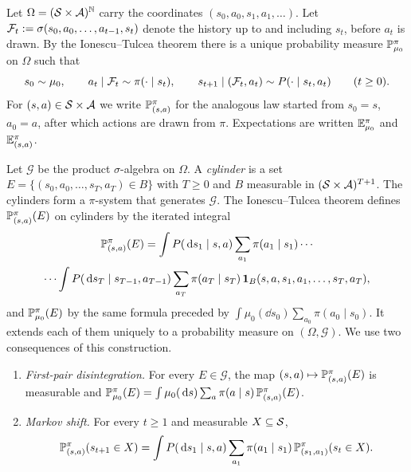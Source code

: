 Let $\Omega=(\mathcal{S}\times\mathcal{A})^{\mathbb{N}}$ carry the coordinates $(s_0,a_0,s_1,a_1,\dots)$.
Let $\mathcal{F}_t:=\sigma(s_0,a_0,\dots,a_{t-1},s_t)$ denote the history up to and including $s_t$,
before $a_t$ is drawn.
By the Ionescu--Tulcea theorem there is a unique probability measure $\mathbb{P}^\pi_{\mu_0}$ on
$\Omega$ such that
\begin{equation}\label{eq:occ-traj}
  s_0\sim\mu_0,\qquad
  a_t\mid\mathcal{F}_t\sim\pi(\cdot\mid s_t),\qquad
  s_{t+1}\mid(\mathcal{F}_t,a_t)\sim P(\cdot\mid s_t,a_t)\qquad(t\ge0).
\end{equation}
For $(s,a)\in\mathcal{S}\times\mathcal{A}$ we write $\mathbb{P}^\pi_{(s,a)}$ for the analogous law started from
$s_0=s$, $a_0=a$, after which actions are drawn from $\pi$.
Expectations are written $\mathbb{E}^\pi_{\mu_0}$ and $\mathbb{E}^\pi_{(s,a)}$.

Let $\mathcal G$ be the product $\sigma$-algebra on $\Omega$.
A \emph{cylinder} is a set $E=\{(s_0,a_0,\dots,s_T,a_T)\in B\}$ with $T\ge0$ and $B$ measurable in $(\mathcal{S}\times\mathcal{A})^{T+1}$.
The cylinders form a $\pi$-system that generates $\mathcal G$.
The Ionescu--Tulcea theorem defines $\mathbb{P}^\pi_{(s,a)}(E)$ on cylinders by the iterated integral
\begin{multline}\label{eq:occ-cyl}
\mathbb{P}^\pi_{(s,a)}(E)=\int P(\,\mathrm{d} s_1\mid s,a)\sum_{a_1}\pi(a_1\mid s_1)\cdots\\
\cdots\int P(\,\mathrm{d} s_T\mid s_{T-1},a_{T-1})\sum_{a_T}\pi(a_T\mid s_T)\,\mathbf{1}_B(s,a,s_1,a_1,\dots,s_T,a_T),
\end{multline}
and $\mathbb{P}^\pi_{\mu_0}(E)$ by the same formula preceded by $\int\mu_0(\dd s_0)\sum_{a_0}\pi(a_0\mid s_0)$.
It extends each of them uniquely to a probability measure on $(\Omega,\mathcal G)$.
We use two consequences of this construction.
\begin{enumerate}[nosep,label=(M\arabic*)]
\item\label{M1} \emph{First-pair disintegration.} For every $E\in\mathcal G$, the map $(s,a)\mapsto\mathbb{P}^\pi_{(s,a)}(E)$ is measurable and
  $\mathbb{P}^\pi_{\mu_0}(E)=\int\mu_0(\,\mathrm{d} s)\sum_{a}\pi(a\mid s)\,\mathbb{P}^\pi_{(s,a)}(E)$.
\item\label{M2} \emph{Markov shift.} For every $t\ge1$ and measurable $X\subseteq\mathcal{S}$,
  \[
    \mathbb{P}^\pi_{(s,a)}(s_{t+1}\in X)=\int P(\,\mathrm{d} s_1\mid s,a)\sum_{a_1}\pi(a_1\mid s_1)\,
    \mathbb{P}^\pi_{(s_1,a_1)}(s_t\in X).
  \]
\end{enumerate}
